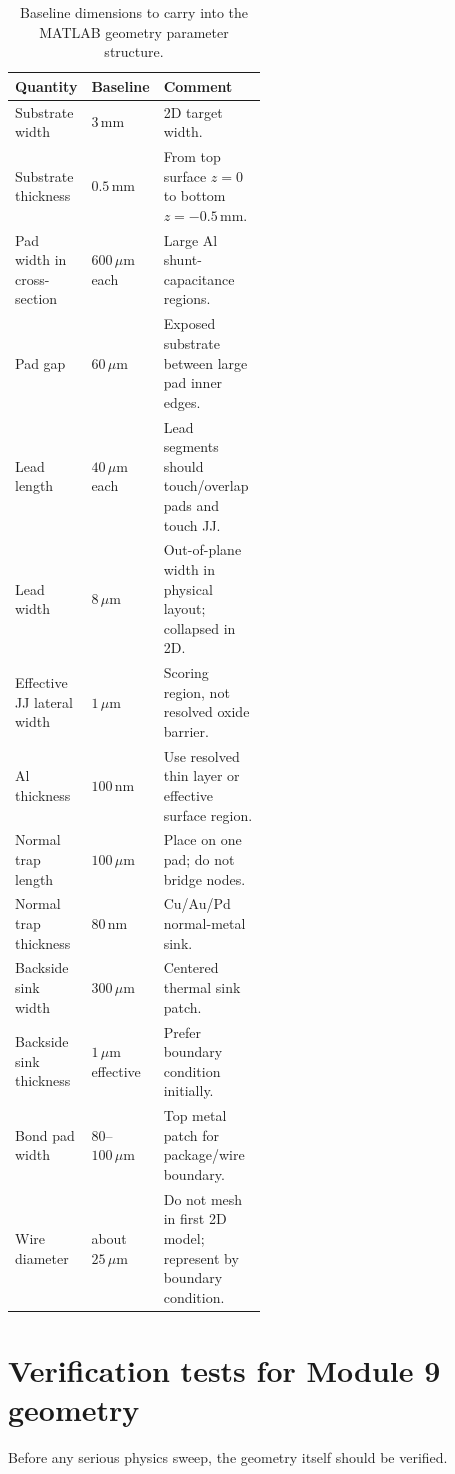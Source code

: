 \documentclass[11pt]{article}
\begin{document}
\begin{table}[H]
\centering
\caption{Baseline dimensions to carry into the MATLAB geometry parameter structure.}
\label{tab:implementation_sequence_dims}
\small
\begin{tabularx}{\linewidth}{>{\RaggedRight\arraybackslash}p{0.28\linewidth} >{\RaggedRight\arraybackslash}p{0.22\linewidth} Y}
\toprule
\textbf{Quantity} & \textbf{Baseline} & \textbf{Comment}\\
\midrule
Substrate width & $3\,\mathrm{mm}$ & 2D target width.\\
Substrate thickness & $0.5\,\mathrm{mm}$ & From top surface $z=0$ to bottom $z=-0.5\,\mathrm{mm}$.\\
Pad width in cross-section & $600\,\mu\mathrm{m}$ each & Large Al shunt-capacitance regions.\\
Pad gap & $60\,\mu\mathrm{m}$ & Exposed substrate between large pad inner edges.\\
Lead length & $40\,\mu\mathrm{m}$ each & Lead segments should touch/overlap pads and touch JJ.\\
Lead width & $8\,\mu\mathrm{m}$ & Out-of-plane width in physical layout; collapsed in 2D.\\
Effective JJ lateral width & $1\,\mu\mathrm{m}$ & Scoring region, not resolved oxide barrier.\\
Al thickness & $100\,\mathrm{nm}$ & Use resolved thin layer or effective surface region.\\
Normal trap length & $100\,\mu\mathrm{m}$ & Place on one pad; do not bridge nodes.\\
Normal trap thickness & $80\,\mathrm{nm}$ & Cu/Au/Pd normal-metal sink.\\
Backside sink width & $300\,\mu\mathrm{m}$ & Centered thermal sink patch.\\
Backside sink thickness & $1\,\mu\mathrm{m}$ effective & Prefer boundary condition initially.\\
Bond pad width & $80$--$100\,\mu\mathrm{m}$ & Top metal patch for package/wire boundary.\\
Wire diameter & about $25\,\mu\mathrm{m}$ & Do not mesh in first 2D model; represent by boundary condition.\\
\bottomrule
\end{tabularx}
\end{table}

\section{Verification tests for Module 9 geometry}
Before any serious physics sweep, the geometry itself should be verified.
\end{document}
